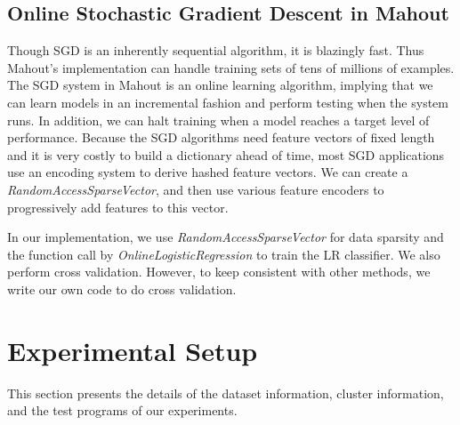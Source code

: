 \documentclass[10pt, conference, compsocconf]{IEEEtran}
\begin{document}
\subsection{Online Stochastic Gradient Descent in Mahout}
Though SGD is an inherently sequential algorithm, it is blazingly fast. Thus Mahout's implementation can handle training sets of tens of millions of examples.
The SGD system in Mahout is an online learning algorithm, implying that we can learn models in an incremental fashion and perform testing when the system runs.
In addition, we can halt training when a model reaches a target level of performance.
Because the SGD algorithms need feature vectors of fixed length and it is very costly to build a dictionary ahead of time, most SGD applications use an encoding system to derive hashed feature vectors. We can create a \textit{RandomAccessSparseVector}, and then use various feature encoders to progressively add features to this vector.

In our implementation, we use \textit{RandomAccessSparseVector} for data sparsity and the function call by \textit{OnlineLogisticRegression} to train the LR classifier.
We also perform cross validation. However, to keep consistent with other methods, we write our own code to do cross validation.
	
\section{Experimental Setup} \label{sec:setup}
This section presents the details of the dataset information, cluster information, and the test programs of our experiments.
\end{document}
